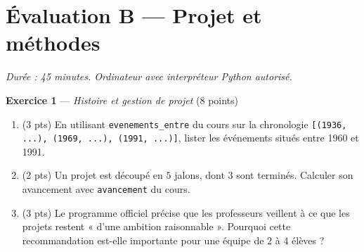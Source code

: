 \section*{Évaluation B --- Projet et méthodes}
\textit{Durée : 45 minutes. Ordinateur avec interpréteur Python autorisé.}


\bigskip

\textbf{Exercice 1} --- \textit{Histoire et gestion de projet} \hfill (8 points)

\begin{enumerate}
  \item (3 pts) En utilisant \lstinline{evenements_entre} du cours sur la chronologie \lstinline{[(1936, ...), (1969, ...), (1991, ...)]}, lister les événements situés entre 1960 et 1991.
  \item (2 pts) Un projet est découpé en $5$ jalons, dont $3$ sont terminés. Calculer son avancement avec \lstinline{avancement} du cours.
  \item (3 pts) Le programme officiel précise que les professeurs veillent à ce que les projets restent « d'une ambition raisonnable ». Pourquoi cette recommandation est-elle importante pour une équipe de $2$ à $4$ élèves ?
\end{enumerate}


